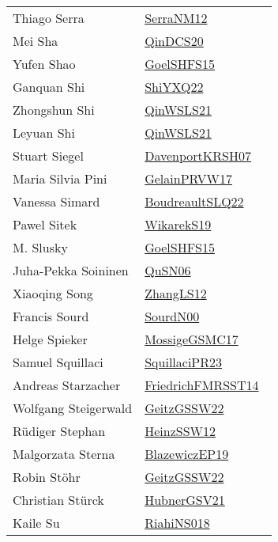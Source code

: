 {\begin{longtable}{p{4cm}p{20cm}}
Thiago Serra & \href{works/SerraNM12.pdf}{SerraNM12}~\cite{SerraNM12}\\
Mei Sha & \href{works/QinDCS20.pdf}{QinDCS20}~\cite{QinDCS20}\\
Yufen Shao & \href{works/GoelSHFS15.pdf}{GoelSHFS15}~\cite{GoelSHFS15}\\
Ganquan Shi & \href{}{ShiYXQ22}~\cite{ShiYXQ22}\\
Zhongshun Shi & \href{works/QinWSLS21.pdf}{QinWSLS21}~\cite{QinWSLS21}\\
Leyuan Shi & \href{works/QinWSLS21.pdf}{QinWSLS21}~\cite{QinWSLS21}\\
Stuart Siegel & \href{works/DavenportKRSH07.pdf}{DavenportKRSH07}~\cite{DavenportKRSH07}\\
Maria Silvia Pini & \href{works/GelainPRVW17.pdf}{GelainPRVW17}~\cite{GelainPRVW17}\\
Vanessa Simard & \href{works/BoudreaultSLQ22.pdf}{BoudreaultSLQ22}~\cite{BoudreaultSLQ22}\\
Pawel Sitek & \href{works/WikarekS19.pdf}{WikarekS19}~\cite{WikarekS19}\\
M. Slusky & \href{works/GoelSHFS15.pdf}{GoelSHFS15}~\cite{GoelSHFS15}\\
Juha{-}Pekka Soininen & \href{works/QuSN06.pdf}{QuSN06}~\cite{QuSN06}\\
Xiaoqing Song & \href{works/ZhangLS12.pdf}{ZhangLS12}~\cite{ZhangLS12}\\
Francis Sourd & \href{}{SourdN00}~\cite{SourdN00}\\
Helge Spieker & \href{works/MossigeGSMC17.pdf}{MossigeGSMC17}~\cite{MossigeGSMC17}\\
Samuel Squillaci & \href{works/SquillaciPR23.pdf}{SquillaciPR23}~\cite{SquillaciPR23}\\
Andreas Starzacher & \href{}{FriedrichFMRSST14}~\cite{FriedrichFMRSST14}\\
Wolfgang Steigerwald & \href{works/GeitzGSSW22.pdf}{GeitzGSSW22}~\cite{GeitzGSSW22}\\
R{\"{u}}diger Stephan & \href{works/HeinzSSW12.pdf}{HeinzSSW12}~\cite{HeinzSSW12}\\
Malgorzata Sterna & \href{}{BlazewiczEP19}~\cite{BlazewiczEP19}\\
Robin St{\"{o}}hr & \href{works/GeitzGSSW22.pdf}{GeitzGSSW22}~\cite{GeitzGSSW22}\\
Christian St{\"{u}}rck & \href{works/HubnerGSV21.pdf}{HubnerGSV21}~\cite{HubnerGSV21}\\
Kaile Su & \href{works/RiahiNS018.pdf}{RiahiNS018}~\cite{RiahiNS018}\\

\end{longtable}}

